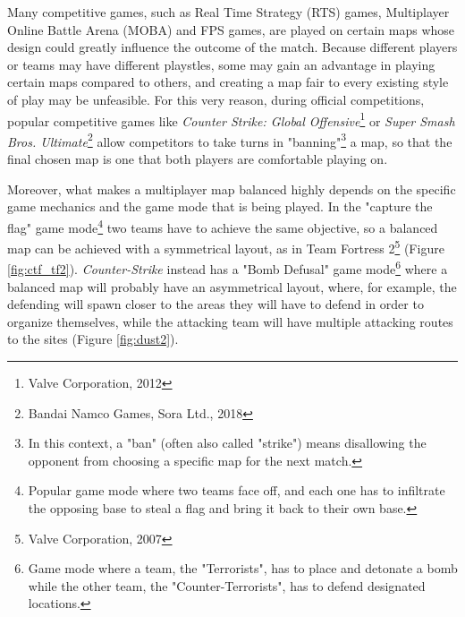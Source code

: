 \documentclass{Configuration_Files/PoliMi3i_thesis}
\begin{document}
Many competitive games, such as Real Time Strategy (RTS) games, Multiplayer Online Battle Arena (MOBA) and FPS games, are played on certain maps whose design could greatly influence the outcome of the match. Because different players or teams may have different playstles, some may gain an advantage in playing certain maps compared to others, and creating a map fair to every existing style of play may be unfeasible. For this very reason, during official competitions, popular competitive games like \textit{Counter Strike: Global Offensive}\footnote{Valve Corporation, 2012} or \textit{Super Smash Bros. Ultimate}\footnote{Bandai Namco Games, Sora Ltd., 2018} allow competitors to take turns in "banning"\footnote{In this context, a "ban" (often also called "strike") means disallowing the opponent from choosing a specific map for the next match.} a map, so that the final chosen map is one that both players are comfortable playing on.

Moreover, what makes a multiplayer map balanced highly depends on the specific game mechanics and the game mode that is being played. In the "capture the flag" game mode\footnote{Popular game mode where two teams face off, and each one has to infiltrate the opposing base to steal a flag and bring it back to their own base.} two teams have to achieve the same objective, so a balanced map can be achieved with a symmetrical layout, as in Team Fortress 2\footnote{Valve Corporation, 2007} (Figure \ref{fig:ctf_tf2}). \textit{Counter-Strike} instead has a "Bomb Defusal" game mode\footnote{Game mode where a team, the "Terrorists", has to place and detonate a bomb while the other team, the "Counter-Terrorists", has to defend designated locations.} where a balanced map will probably have an asymmetrical layout, where, for example, the defending will spawn closer to the areas they will have to defend in order to organize themselves, while the attacking team will have multiple attacking routes to the sites (Figure \ref{fig:dust2}).
\end{document}
